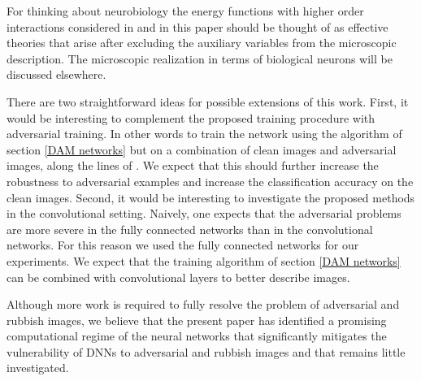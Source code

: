 For thinking about neurobiology the energy functions with higher order interactions considered in \cite{Krotov Hopfield} and in this paper should be thought of as effective theories that arise after excluding the auxiliary variables from the microscopic description. The microscopic realization in terms of biological neurons will be discussed elsewhere. 

There are two straightforward ideas for possible extensions of this work. First, it would be interesting to complement the proposed training procedure with adversarial training. In other words to train the network using the algorithm of section \ref{DAM networks} but on a combination of clean images and adversarial images, along the lines of \cite{Nokland,sign gradient}.  We expect that this should further increase the robustness to adversarial examples and increase the classification accuracy on the clean images. Second, it would be interesting to investigate the proposed methods in the convolutional setting. Naively, one expects that the adversarial problems are more severe in the fully connected networks than in the convolutional networks. For this reason we used the fully connected networks for our experiments. We expect that the training algorithm of section \ref{DAM networks} can be combined with convolutional layers to better describe images.  

Although more work is required to fully resolve the problem of adversarial and rubbish images, we believe that the present paper has identified a promising computational regime of the neural networks that significantly mitigates the vulnerability of DNNs to adversarial and rubbish images and that remains little investigated.


